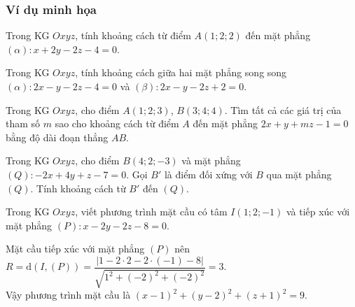 \subsubsection{Ví dụ minh họa}
\setcounter{subsubsection}{0}
\setcounter{vd}{0}
\setcounter{bt}{0}
\setcounter{ex}{0}
\begin{vd} %
	Trong KG $Oxyz$, tính  khoảng cách từ điểm $A(1;2;2)$ đến mặt phẳng $(\alpha)\colon x+2y-2z-4=0$.

\end{vd}
\begin{vd} %
	Trong KG $Oxyz$, tính khoảng cách giữa hai mặt phẳng song song $(\alpha)\colon 2x-y-2z-4=0$ và $(\beta)\colon 2x-y-2z+2=0$.
\end{vd}
\begin{vd}%
	Trong KG $Oxyz$, cho  điểm $A(1;2;3)$, $B(3;4;4)$. Tìm tất cả các giá trị của tham số $m$ sao cho khoảng cách từ điểm $A$ đến mặt phẳng $2x+y+mz-1=0$ bằng độ dài đoạn thẳng $AB$.
	
\end{vd}
\begin{vd}%
	Trong KG $Oxyz$, cho điểm $B(4;2;-3)$ và mặt phẳng $(Q):-2x+4y+z-7=0$. Gọi $B'$ là điểm đối xứng với $B$ qua mặt phẳng $(Q)$. Tính khoảng cách từ $B'$ đến $(Q)$.
\end{vd}
\begin{vd}%
	Trong KG $Oxyz$, viết phương trình mặt cầu có tâm $I(1; 2; -1)$ và tiếp xúc với mặt phẳng $(P)\colon x-2y-2z-8=0$.

	\loigiai
	{Mặt cầu tiếp xúc với mặt phẳng $(P)$ nên  $R=\mathrm{d}\left(I, (P)\right)=\dfrac{|1-2\cdot 2-2\cdot (-1)-8|}{\sqrt{1^2+(-2)^2+(-2)^2}}=3$.\\
		Vậy	phương trình mặt cầu là $(x - 1)^2 + (y - 2)^2 + (z + 1)^2= 9$.
	}
\end{vd}
